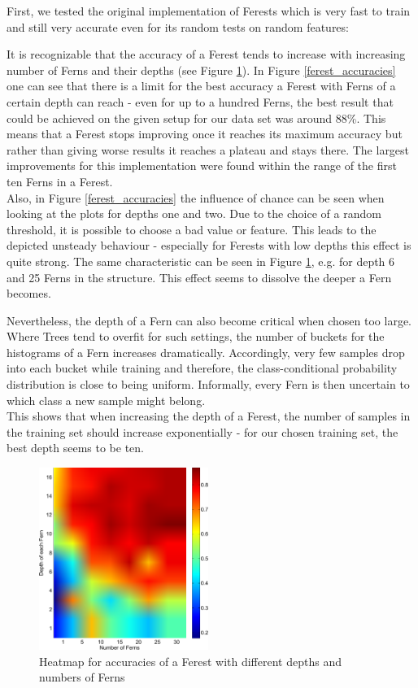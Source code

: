 \documentclass[twocolumn]{article}
\begin{document}
First, we tested the original implementation of Ferests which is very fast to train and still very accurate even for its random tests on random features:

It is recognizable that the accuracy of a Ferest tends to increase with increasing number of Ferns and their depths (see Figure \ref{ferest_heatmap}). In Figure \ref{ferest_accuracies} one can see that there is a limit for the best accuracy a Ferest with Ferns of a certain depth can reach - even for up to a hundred Ferns, the best result that could be achieved on the given setup for our data set was around 88\%. This means that a Ferest stops improving once it reaches its maximum accuracy but rather than giving worse results it reaches a plateau and stays there. The largest improvements for this implementation were found within the range of the first ten Ferns in a Ferest.\\
Also, in Figure \ref{ferest_accuracies} the influence of chance can be seen when looking at the plots for depths one and two. Due to the choice of a random threshold, it is possible to choose a bad value or feature. This leads to the depicted unsteady behaviour - especially for Ferests with low depths this effect is quite strong. The same characteristic can be seen in Figure \ref{ferest_heatmap}, e.g. for depth 6 and 25 Ferns in the structure. This effect seems to dissolve the deeper a Fern becomes.

Nevertheless, the depth of a Fern can also become critical when chosen too large. Where Trees tend to overfit for such settings, the number of buckets for the histograms of a Fern increases dramatically. Accordingly, very few samples drop into each bucket while training and therefore, the class-conditional probability distribution is close to being uniform. Informally, every Fern is then uncertain to which class a new sample might belong.\\
This shows that when increasing the depth of a Ferest, the number of samples in the training set should increase exponentially - for our chosen training set, the best depth seems to be ten.

\begin{figure}[h] 
\centering
\includegraphics[width=0.49\textwidth]{Diagrams/heatmap_randFerns_16_30}
\caption{Heatmap for accuracies of a Ferest with different depths and numbers of Ferns}
\label{ferest_heatmap}
\end{figure}
\end{document}

